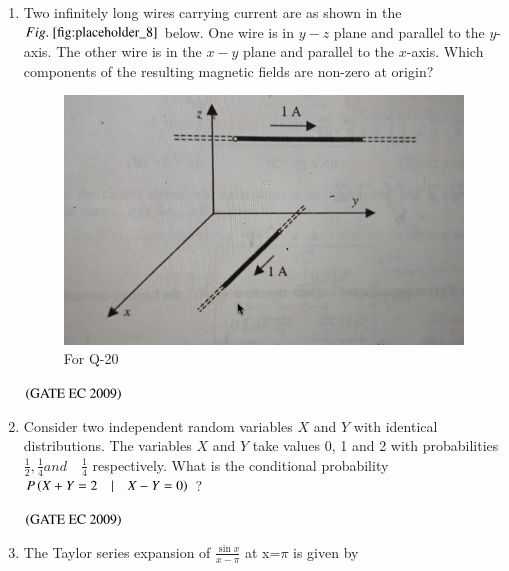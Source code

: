 \documentclass[journal,12pt,onecolumn]{IEEEtran}
\theoremstyle{remark}
\begin{document}
\begin{enumerate}[start=1, label={Q\arabic*.}]
\item Two infinitely long wires carrying current are as shown in the $\figref{fig:placeholder_8}$ below. One wire is in $y-z$ plane and parallel to the $y$-axis. The other wire is in the $x-y$ plane and parallel to the $x$-axis. Which components of the resulting magnetic fields are non-zero at origin?
\begin{figure}[H]
    \centering
    \includegraphics[width=0.5\columnwidth]{figs/img_8.jpg}
    \caption{For Q-20}
    \label{fig:placeholder_8}
\end{figure}
\begin{enumerate}
\end{enumerate}
\hfill $\left(\text{GATE EC 2009}\right)$
\item Consider two independent random variables $X$ and $Y$ with identical distributions. The variables $X$ and $Y$ take values 0, 1 and 2 with probabilities $\frac{1}{2}, \frac{1}{4} and  \quad \frac{1}{4}$ respectively. What is the conditional probability $P\left(X+Y=2 \quad| \quad X-Y=0\right)$ ?

\begin{enumerate}
\end{enumerate}
\hfill $\left(\text{GATE EC 2009}\right)$

\item The Taylor series expansion of $\frac{\sin x}{x-\pi}$ at x=$\pi$ is given by


\end{enumerate}
\end{document}
